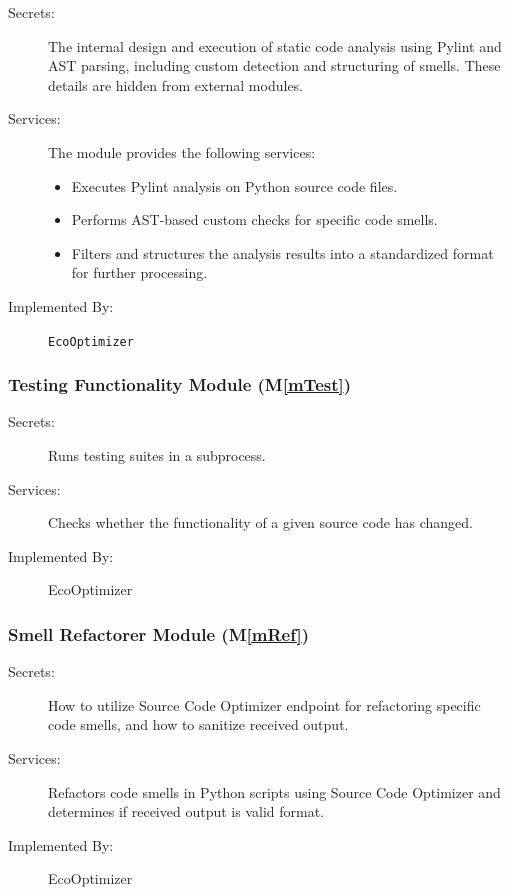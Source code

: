 \documentclass[12pt, titlepage]{article}
\newcommand{\mref}[1]{M\ref{#1}}
\begin{document}
\begin{description}
\item[Secrets:] The internal design and execution of static code analysis using Pylint and AST parsing, including custom detection and structuring of smells. These details are hidden from external modules.
\item[Services:] The module provides the following services:
  \begin{itemize}
    \item Executes Pylint analysis on Python source code files.
    \item Performs AST-based custom checks for specific code smells.
    \item Filters and structures the analysis results into a standardized format for further processing.
  \end{itemize}
\item[Implemented By:] \texttt{EcoOptimizer}
\end{description}

\subsubsection{Testing Functionality Module (\mref{mTest})}


\begin{description}
    \item[Secrets:] Runs testing suites in a subprocess.
    \item[Services:] Checks whether the functionality of a given source code has changed.
    \item[Implemented By:] EcoOptimizer
\end{description}

\subsubsection{Smell Refactorer Module (\mref{mRef})}


\begin{description}
    \item[Secrets:] How to utilize Source Code Optimizer endpoint for refactoring specific code smells, and how to sanitize received output.
    \item[Services:] Refactors code smells in Python scripts using Source Code Optimizer and determines if received output is valid format.
    \item[Implemented By:] EcoOptimizer
\end{description}
\end{document}
